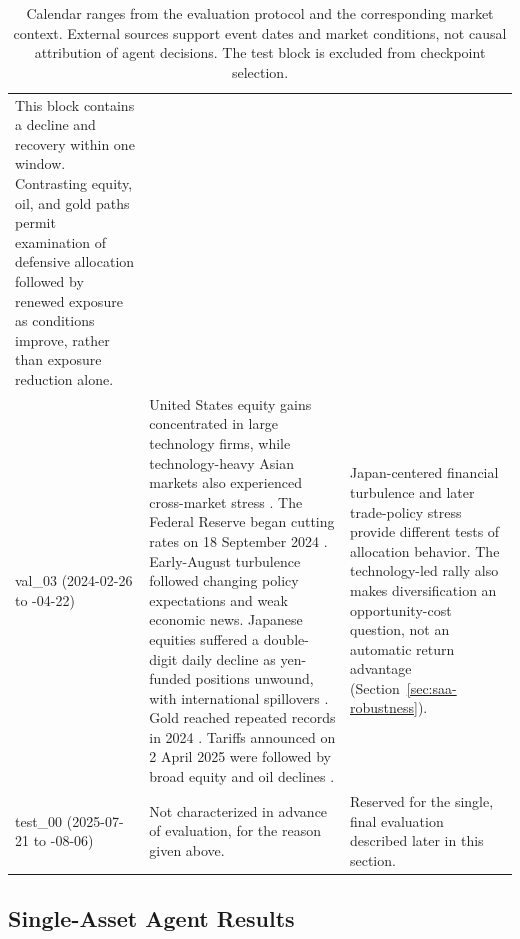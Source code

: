 \begin{table}[p]
\begin{tabular}{@{}p{2.46cm}p{6.85cm}p{6.85cm}@{}}
This block contains a decline and recovery within one window. Contrasting equity, oil, and gold paths permit examination of defensive allocation followed by renewed exposure as conditions improve, rather than exposure reduction alone. \\
\addlinespace
val\_03 \newline (2024-02-26 to \newline 2025-04-22) &
United States equity gains concentrated in large technology firms, while technology-heavy Asian markets also experienced cross-market stress \cite{BISCarryTrades2024}. The Federal Reserve began cutting rates on 18 September 2024 \cite{FedRateCutSeptember2024}. Early-August turbulence followed changing policy expectations and weak economic news. Japanese equities suffered a double-digit daily decline as yen-funded positions unwound, with international spillovers \cite{BISCarryTrades2024}. Gold reached repeated records in 2024 \cite{WorldGoldCouncil2024}. Tariffs announced on 2 April 2025 were followed by broad equity and oil declines \cite{USReciprocalTariffs2025,IMFGlobalStabilityApril2025,WorldBankCommodityPrices}. &
Japan-centered financial turbulence and later trade-policy stress provide different tests of allocation behavior. The technology-led rally also makes diversification an opportunity-cost question, not an automatic return advantage (Section~\ref{sec:saa-robustness}). \\
\addlinespace
test\_00 \newline (2025-07-21 to \newline 2026-08-06) &
Not characterized in advance of evaluation, for the reason given above. &
Reserved for the single, final evaluation described later in this section. \\
\bottomrule
\end{tabular}
\caption{Calendar ranges from the evaluation protocol and the corresponding market context. External sources support event dates and market conditions, not causal attribution of agent decisions. The test block is excluded from checkpoint selection.}
\label{tab:oos-blocks}
\end{table}


\subsection{Single-Asset Agent Results}
\label{sec:saa-results}


